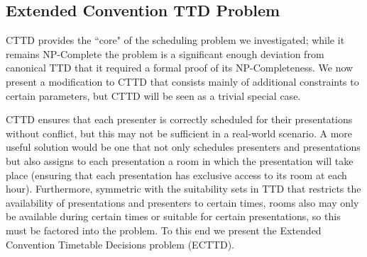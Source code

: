 \documentclass[]{article}
\theoremstyle{definition}
\theoremstyle{remark}
\numberwithin{equation}{section}
\begin{document}
\subsection{Extended Convention TTD Problem}
CTTD provides the ``core" of the scheduling problem we investigated; while it remains NP-Complete the problem is a significant enough deviation from canonical TTD that it required a formal proof of its NP-Completeness. We now present a modification to CTTD that consists mainly of additional constraints to certain parameters, but CTTD will be seen as a trivial special case.

CTTD ensures that each presenter is correctly scheduled for their presentations without conflict, but this may not be sufficient in a real-world scenario. A more useful solution would be one that not only schedules presenters and presentations but also assigns to each presentation a room in which the presentation will take place (ensuring that each presentation has exclusive access to its room at each hour). Furthermore, symmetric with the suitability sets in TTD that restricts the availability of presentations and presenters to certain times, rooms also may only be available during certain times or suitable for certain presentations, so this must be factored into the problem. To this end we present the Extended Convention Timetable Decisions problem (ECTTD).
\end{document}
